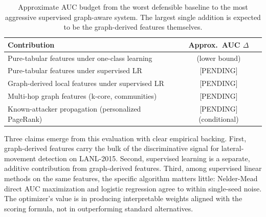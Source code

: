\begin{table}[h]
\centering
\begin{tabular}{lc}
\hline
Contribution & Approx.\ AUC $\Delta$ \\
\hline
Pure-tabular features under one-class learning & (lower bound) \\
Pure-tabular features under supervised LR      & [PENDING] \\
Graph-derived local features under supervised LR & [PENDING] \\
Multi-hop graph features (k-core, communities)  & [PENDING] \\
Known-attacker propagation (personalized PageRank) & [PENDING] (conditional) \\
\hline
\end{tabular}
\caption{Approximate AUC budget from the worst defensible baseline to the most aggressive supervised graph-aware system. The largest single addition is expected to be the graph-derived features themselves.}
\label{tab:auc_budget}
\end{table}

Three claims emerge from this evaluation with clear empirical backing. First, graph-derived features carry the bulk of the discriminative signal for lateral-movement detection on LANL-2015. Second, supervised learning is a separate, additive contribution from graph-derived features. Third, among supervised linear methods on the same features, the specific algorithm matters little: Nelder-Mead direct AUC maximization and logistic regression agree to within single-seed noise. The optimizer's value is in producing interpretable weights aligned with the scoring formula, not in outperforming standard alternatives.
